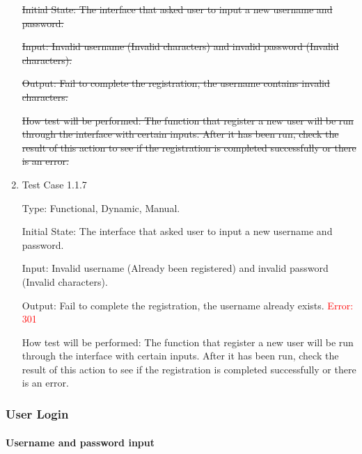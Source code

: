 \documentclass[12pt, titlepage]{article}
\begin{document}
\begin{enumerate}
\st{Initial State: The interface that asked user to input a new username and password.}
					
\st{Input: Invalid username (Invalid characters) and invalid password (Invalid characters).}
					
\st{Output: Fail to complete the registration, the username contains invalid characters.}
					
\st{How test will be performed: The function that register a new user will be run through the interface with certain inputs. After it has been run, check the result of this action to see if the registration is completed successfully or there is an error.}

\item{Test Case 1.1.7\\}

Type: Functional, Dynamic, Manual.
					
Initial State: The interface that asked user to input a new username and password.
					
Input: Invalid username (Already been registered) and invalid password (Invalid characters).
					
Output: Fail to complete the registration, the username already exists. \textcolor{red}{Error: 301}
					
How test will be performed: The function that register a new user will be run through the interface with certain inputs. After it has been run, check the result of this action to see if the registration is completed successfully or there is an error.

\end{enumerate}

\subsubsection{User Login }

\paragraph{Username and password input}
\end{document}
